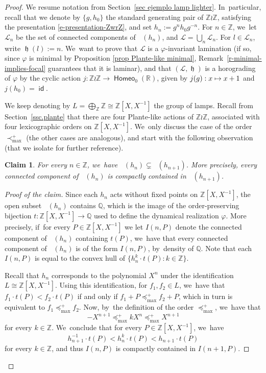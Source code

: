 \documentclass[JEP,XML,SOM,Unicode,NoFloatCountersInSection,published]{cedram}
\def\mto{\mathchoice{\longmapsto}{\mapsto}{\mapsto}{\mapsto}}
\newtheorem{claimnum}{Claim}
\theoremstyle{definition}
\DeclareMathOperator{\homeo}{\mathsf{Homeo}}
\DeclareMathOperator{\hor}{\mathfrak{h}}
\DeclareMathOperator{\id}{\mathsf{id}}
\DeclareMathOperator{\suppphi}{\mathsf{Supp}^\varphi}
\newcommand{\R}{\mathbb{R}}
\newcommand{\Q}{\mathbb Q}
\newcommand{\Z}{\mathbb Z}
\newcommand{\Lcal}{\mathcal{L}}
\begin{document}
\begin{proof}
We resume notation from Section~\ref{sec ejemplo lamp lighter}. In~particular, recall that we denote by $\{g, h_0\}$ the standard generating pair of $\Z \wr \Z$, satisfying the presentation \eqref{e-presentation-ZwrZ}, and set $h_n:=g^n h_0 g^{-n}$.
For $n\in \Z$, we~let $\Lcal_n$ be the set of connected components of $\suppphi(h_n)$, and $\Lcal=\bigcup_n \Lcal_n$. For $l\in \Lcal_n$, write $\hor(l):=n$. We~want to prove that $\Lcal$ is a $\varphi$-invariant lamination (if so, since $\varphi$ is minimal by Proposition \ref{prop Plante-like minimal}, Remark~\ref{r-minimal-implies-focal} guarantees that it is laminar), and that $(\Lcal, \hor)$ is a horograding of $\varphi$ by the cyclic action $j\colon \Z \wr \Z\to \homeo_0(\R)$, given by $j(g):x\mto x+1$ and $j(h_0)=\id$.

We keep denoting by $L=\bigoplus_\Z \Z\cong \Z[X, X^{-1}]$ the group of lamps.
Recall from Section~\ref{ssc.plante} that there are four Plante-like actions of $\Z \wr \Z$, associated with four lexicographic orders on $\Z[X, X^{-1}]$. We~only discuss the case of the order $\prec_{\max}^+$ (the other cases are analogous), and start with the following observation (that we isolate for further reference).

\begin{claimnum} \label{l-plante-fixed-points}
For every $n\in \Z$, we~have $\suppphi(h_n)\subsetneq \suppphi(h_{n+1})$. More precisely, every connected component of $\suppphi(h_n)$ is compactly contained in $\suppphi(h_{n+1})$.
\end{claimnum}
\setcounter{claimnum}{0}
\begin{proof}[Proof of the claim]
Since each $h_n$ acts without fixed points on $\Z[X,X^{-1}]$, the open subset $\suppphi(h_n)$ contains $\Q$, which is the image of the order-preserving bijection $t\colon \Z[X,X^{-1}]\to \Q$ used to define the dynamical realization $\varphi$. More precisely, if~for every $P\in \Z[X, X^{-1}]$ we let $I(n, P)$ denote the connected component of $\suppphi(h_n)$ containing $t(P)$, we~have that every connected component of $\suppphi(h_n)$ is of the form $I(n, P)$, by~density of $\Q$. Note that each $I(n, P)$ is equal to the convex hull of $\{h_n^k\cdot t(P): k\in \Z\}$.

Recall that $h_n$ corresponds to the polynomial $X^n$ under the identification $L\cong \Z[X, X^{-1}]$. Using this identification, for $f_1, f_2\in L$, we~have that $f_1\cdot t(P)< f_2\cdot t(P)$ if and only if $f_1+P\preceq_{\max}^+ f_2+P$, which in turn is equivalent to $f_1\preceq_{\max}^+ f_2$. Now, by~the definition of the order $\preceq_{\max}^+$, we~have that
\[-X^{n+1} \preceq_{\max}^+ kX^n \preceq_{\max}^+ X^{n+1}
\]
for every $k\in \Z$. We~conclude that for every $P\in \Z[X, X^{-1}]$, we~have
\[h_{n+1}^{-1}\cdot t(P)< h_n^k\cdot t(P)< h_{n+1}\cdot t(P)
\]
for every $k\in \Z$, and thus ${I(n, P)}$ is compactly contained in $I(n+1, P)$.
\end{proof}


\end{proof}
\end{document}
